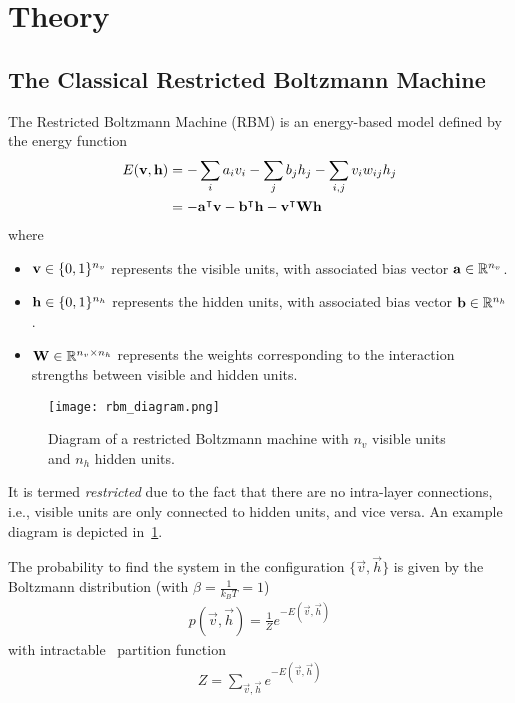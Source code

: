 \section{Theory}
\subsection{The Classical Restricted Boltzmann Machine}
The Restricted Boltzmann Machine (RBM) is an energy-based model defined by the energy function~\cite{goodfellow_deep_learning}
\begin{align}
    E(\mathbf{v}, \mathbf{h})
        &= -\sum_i a_i v_i - \sum_j b_j h_j - \sum_{i,j} v_i w_{ij} h_j \label{eq:rbm_energy} \\
        &= -\mathbf{a}^\intercal\mathbf{v} - \mathbf{b}^\intercal\mathbf{h} - \mathbf{v}^\intercal\mathbf{W}\mathbf{h} \label{eq:rbm_energy_vectorized}
\end{align}
where
\begin{itemize}
    \item \( \mathbf{v} \in \{0,1\}^{n_v} \) represents the visible units, with associated bias vector \( \mathbf{a} \in \mathbb{R}^{n_v} \).
    \item \( \mathbf{h} \in \{0,1\}^{n_h} \) represents the hidden units, with associated bias vector \( \mathbf{b} \in \mathbb{R}^{n_h} \).
    \item \( \mathbf{W} \in \mathbb{R}^{n_v \times n_h} \) represents the weights corresponding to the interaction strengths between visible and hidden units.
\end{itemize}

\begin{figure}[!htb]
    \begin{center}
        \texttt{[image: rbm\_diagram.png]}
    \end{center}
    \caption{Diagram of a restricted Boltzmann machine with \( n_v \) visible units and \( n_h \) hidden units.}
    \label{fig:rbm_diagram}
\end{figure}

It is termed \textit{restricted} due to the fact that there are no intra-layer connections, i.e., visible units are only connected to hidden units, and vice versa.
An example diagram is depicted in~\cref{fig:rbm_diagram}.

The probability to find the system in the configuration \( \{\vec{v},\vec{h}\} \) is given by the Boltzmann distribution (with \( \beta = \frac{1}{k_BT} = 1 \))
\begin{align}
    p(\vec{v}, \vec{h}) = \frac{1}{Z} e^{-E(\vec{v},\vec{h})}
\end{align}
with intractable~\cite{long_servedio_2010} partition function
\begin{align}
    Z = \sum_{\vec{v},\vec{h}} e^{-E(\vec{v},\vec{h})}
\end{align}

